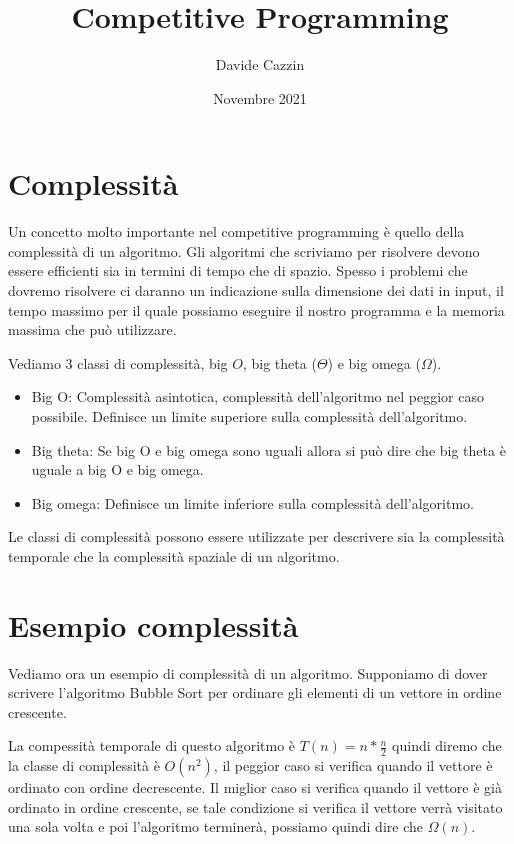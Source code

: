 \documentclass{article}
\title{Competitive Programming}
\author{Davide Cazzin}
\date{Novembre 2021}
\begin{document}
\maketitle

\section{Complessità}

Un concetto molto importante nel competitive programming è quello della complessità di un algoritmo. Gli algoritmi che scriviamo per risolvere devono essere efficienti sia in termini di tempo che di spazio. Spesso i problemi che dovremo risolvere ci daranno un indicazione sulla dimensione dei dati in input, il tempo massimo per il quale possiamo eseguire il nostro programma e la memoria massima che può utilizzare.

Vediamo 3 classi di complessità, big $O$, big theta ($\Theta$) e big omega ($\Omega$).
\begin{itemize}
  \item Big O: Complessità asintotica, complessità dell'algoritmo nel peggior caso possibile. Definisce un limite superiore sulla complessità dell'algoritmo.
  \item Big theta: Se big O e big omega sono uguali allora si può dire che big theta è uguale a big O e big omega.
  \item Big omega: Definisce un limite inferiore sulla complessità dell'algoritmo.
\end{itemize}

Le classi di complessità possono essere utilizzate per descrivere sia la complessità temporale che la complessità spaziale di un algoritmo.

\section{Esempio complessità}

Vediamo ora un esempio di complessità di un algoritmo. Supponiamo di dover scrivere l'algoritmo Bubble Sort per ordinare gli elementi di un vettore in ordine crescente.



La compessità temporale di questo algoritmo è $T(n) = n * \frac{n}{2}$ quindi diremo che la classe di complessità è $O(n^2)$, il peggior caso si verifica quando il vettore è ordinato con ordine decrescente. Il miglior caso si verifica quando il vettore è già ordinato in ordine crescente, se tale condizione si verifica il vettore verrà visitato una sola volta e poi l'algoritmo terminerà, possiamo quindi dire che $\Omega(n)$.
\end{document}
